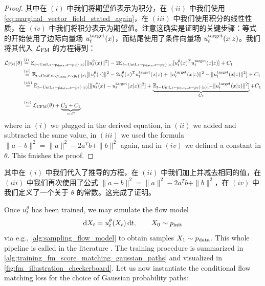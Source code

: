 \begin{proof}
其中在 $(i)$ 中我们将期望值表示为积分，在 $(ii)$ 中我们使用\cref{eq:marginal_vector_field_stated_again}，在 $(iii)$ 中我们使用积分的线性性质，在 $(iv)$ 中我们将积分表示为期望值。注意这确实是证明的关键步骤：等式的开始使用了边际向量场 $u^{\text{target}}_t(x)$，而结尾使用了条件向量场 $u^{\text{target}}_t(x|z)$。我们将其代入 $\mathcal{L}_{\text{FM}}$ 的方程得到：
\begin{align*}
\mathcal{L}_{\text{FM}}(\theta)&\overset{(i)}{=}\mathbb{E}_{t\sim\text{Unif},z\sim p_{\rm{data}}, x\sim p_t(\cdot|z)}[\|u_t^\theta(x)\|^2]-2\mathbb{E}_{t\sim\text{Unif},z\sim p_{\rm{data}}, x\sim p_t(\cdot|z)}[u_t^\theta(x)^Tu^{\text{target}}_t(x|z)] +C_1\\
&\overset{(ii)}{=}\mathbb{E}_{t\sim\text{Unif},z\sim p_{\rm{data}}, x\sim p_t(\cdot|z)}[\|u_t^\theta(x)\|^2-2u_t^\theta(x)^Tu^{\text{target}}_t(x|z)+\|u^{\text{target}}_t(x|z)\|^2-\|u^{\text{target}}_t(x|z)\|^2] +C_1\\
&\overset{(iii)}{=}\mathbb{E}_{t\sim\text{Unif},z\sim p_{\rm{data}}, x\sim p_t(\cdot|z)}[\|u_t^\theta(x)-u^{\text{target}}_t(x|z)\|^2]+\underbrace{\mathbb{E}_{t\sim\text{Unif},z\sim p_{\rm{data}}, x\sim p_t(\cdot|z)}[-\|u^{\text{target}}_t(x|z)\|^2]}_{C_2} +C_1\\
&\overset{(iv)}{=}\mathcal{L}_{\text{CFM}}(\theta) + \underbrace{C_2+C_1}_{=:C}
\end{align*}
where in $(i)$ we plugged in the derived equation, in $(ii)$ we added and subtracted the same value,  in $(iii)$ we used the formula $\|a-b\|^2=\|a\|^2-2a^Tb+\|b\|^2$ again, and in $(iv)$ we defined a constant in $\theta$. This finishes the proof.
\end{proof}

其中在 $(i)$ 中我们代入了推导的方程，在 $(ii)$ 中我们加上并减去相同的值，在 $(iii)$ 中我们再次使用了公式 $\|a-b\|^2=\|a\|^2-2a^Tb+\|b\|^2$，在 $(iv)$ 中我们定义了一个关于 $\theta$ 的常数。这完成了证明。

Once $u_t^{\theta}$ has been trained, we may simulate the flow model
\begin{align}
\label{eq:sde_extension_restated}
    \mathrm{d} X_t = u_t^\theta(X_t)\, \mathrm{d} t,\quad\quad X_0\sim p_{\rm{init}}
\end{align}
via e.g., \cref{alg:sampling_flow_model} to obtain samples $X_1\sim p_{\rm{data}}$. This whole pipeline is called  in the literature \citep{lipman2022flow, liu2022flow, albergo2023stochastic, lipman2024flow}. The training procedure is summarized in \cref{alg:training_fm_score_matching_gaussian_paths} and visualized in \cref{fig:fm_illustration_checkerboard}. Let us now instantiate the conditional flow matching loss for the choice of Gaussian probability paths:

